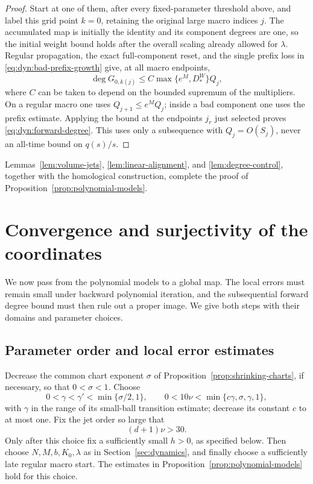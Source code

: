 \documentclass[11pt]{article}
\theoremstyle{definition}
\theoremstyle{remark}
\numberwithin{equation}{section}
\begin{document}
\begin{proof}
Start at one of them, after every fixed-parameter threshold above,
and label this grid point $k=0$, retaining the original large macro
indices $j$.  The accumulated map is initially the identity and its
component degrees are one, so the initial weight bound holds after
the overall scaling already allowed for $\lambda$.  Regular
propagation, the exact full-component reset, and the single prefix
loss in \eqref{eq:dyn:bad-prefix-growth} give, at all macro endpoints,
\[
 \deg G_{0,k(j)}\le
 C\max\{e^M,D_*^W\}Q_j,
\]
where $C$ can be taken to depend on the bounded supremum of the
multipliers.  On a regular macro one uses
$Q_{j+1}\le e^M Q_j$; inside a bad component one uses the prefix
estimate.  Applying the bound at the endpoints $j_r$ just selected
proves \eqref{eq:dyn:forward-degree}.  This uses only a subsequence
with $Q_j=O(S_j)$, never an all-time bound on $q(s)/s$.
\end{proof}

Lemmas~\ref{lem:volume-jets}, \ref{lem:linear-alignment}, and
\ref{lem:degree-control}, together with the homological construction,
complete the proof of Proposition~\ref{prop:polynomial-models}.

\section{Convergence and surjectivity of the coordinates}
\label{sec:uniformization}

We now pass from the polynomial models to a global map.  The local
errors must remain small under backward polynomial iteration, and the
subsequential forward degree bound must then rule out a proper image.
We give both steps with their domains and parameter choices.

\subsection{Parameter order and local error estimates}

Decrease the common chart exponent $\sigma$ of
Proposition~\ref{prop:shrinking-charts}, if necessary, so that
$0<\sigma<1$.  Choose
\begin{equation}
 0<\gamma<\gamma'<\min\{\sigma/2,1\},
 \qquad 0<10\nu<\min\{c\gamma,\sigma,\gamma,1\},
 \label{eq:unif:decay-parameters}
\end{equation}
with $\gamma$ in the range of its small-ball transition estimate;
decrease its constant $c$ to at most one.  Fix the jet order so large
that
\begin{equation}
 (d+1)\nu>30.
 \label{eq:unif:jet-order}
\end{equation}
Only after this choice fix a sufficiently small $h>0$, as specified
below.  Then choose $N,M,b,K_0,\lambda$ as in
Section~\ref{sec:dynamics}, and finally choose a sufficiently late
regular macro start.  The estimates in
Proposition~\ref{prop:polynomial-models} hold for this choice.
\end{document}
